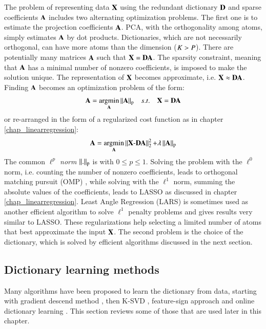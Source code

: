 The problem of representing data $ \mathbf{X} $ using the redundant dictionary $ \mathbf{D} $ and sparse coefficients $ \mathbf{A} $ includes two alternating optimization problems. The first one is to estimate the projection coefficients $ \mathbf{A} $. PCA, with the orthogonality among atoms, simply estimates $ \mathbf{A} $ by dot products. Dictionaries, which are not necessarily orthogonal, can have more atoms than the dimension ($ K > P $). There are potentially many matrices $ \mathbf{A} $ such that $ \mathbf{X} = \mathbf{D} \mathbf{A} $. The sparsity constraint, meaning that $ \mathbf{A} $ has a minimal number of nonzero coefficients, is imposed to make the solution unique. The representation of $ \mathbf{X} $ becomes approximate, i.e. $ \mathbf{X} \approx \mathbf{D} \mathbf{A} $. Finding $ \mathbf{A} $ becomes an optimization problem of the form:
\begin{equation}
\mathbf{A} = \operatorname*{\arg\!\min}_{\mathbf{A}}{\operatorname{\Arrowvert \mathit{\mathbf{A}} \Arrowvert_p }} \quad s.t. \quad \mathbf{X} = \mathbf{D} \mathbf{A}
\end{equation}
or re-arranged in the form of a regularized cost function as in chapter \ref{chap_linearregression}:
\begin{equation}
\mathbf{A} = \operatorname*{\arg\!\min}_{\mathbf{A}}{\operatorname{\Arrowvert \mathit{\mathbf{X} - \mathbf{D} \mathbf{A}} \Arrowvert^2_2 } + \lambda \operatorname{\Arrowvert \mathit{\mathbf{A}} \Arrowvert_p }}
\end{equation}
The common \textit{$ \ell^p $ norm} $ \operatorname{\Arrowvert \mathit{.} \Arrowvert_p } $ is with $ 0 \leq p \leq 1 $. Solving the problem with the $ \ell^0 $ norm, i.e. counting the number of nonzero coefficients, leads to orthogonal matching pursuit (OMP) \citep{tropp2007signal}, while solving with the $ \ell^1 $ norm, summing the absolute values of the coefficients, leads to LASSO as discussed in chapter \ref{chap_linearregression}. Least Angle Regression (LARS) \citep{efron2004least} is sometimes used as another efficient algorithm to solve $ \ell^1 $ penalty problems and gives results very similar to LASSO. These regularizations help selecting a limited number of atoms that best approximate the input $ \mathbf{X} $. The second problem is the choice of the dictionary, which is solved by efficient algorithms discussed in the next section.

\subsection{Dictionary learning methods}
Many algorithms have been proposed to learn the dictionary from data, starting with gradient descend method \citep{olshausen1996emergence}, then K-SVD \citep{aharon2006ksvd}, feature-sign approach \citep{lee2006efficient} and online dictionary learning \citep{mairal2010online}. This section reviews some of those that are used later in this chapter. 

